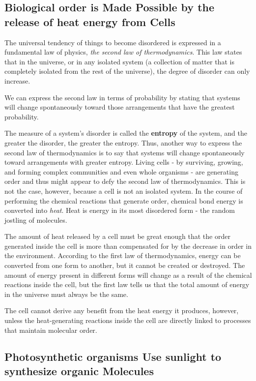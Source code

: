 \subsection{Biological order is Made Possible by the release of heat energy from Cells}

The universal tendency of things to become disordered is expressed in a
fundamental law of physics, \textit{the second law of thermodynamics}. This law
states that in the universe, or in any isolated system (a collection of matter
that is completely isolated from the rest of the universe), the degree
of disorder can only increase.

We can express the second law in terms of probability by stating that
systems will change spontaneously toward those arrangements that have
the greatest probability.

The measure of a system’s disorder is called the \textbf{entropy} of the system,
and the greater the disorder, the greater the entropy. Thus, another way
to express the second law of thermodynamics is to say that systems will
change spontaneously toward arrangements with greater entropy.
Living cells - by surviving, growing, and forming complex communities and
even whole organisms - are generating order and thus might appear to
defy the second law of thermodynamics. This is not the case, however,
because a cell is not an isolated system.
In the course of performing the chemical reactions that generate
order, chemical bond energy is converted into \textit{heat}. Heat is energy in its
most disordered form - the random jostling of molecules.

The amount of heat released by a cell must be great enough that the order
generated inside the cell is more than compensated for by the decrease
in order in the environment.
According to the first law of thermodynamics, energy can be converted from one form to
another, but it cannot be created or destroyed.
The amount of energy
present in different forms will change as a result of the chemical reactions
inside the cell, but the first law tells us that the total amount of
energy in the universe must always be the same.

The cell cannot derive any benefit from the heat energy it produces,
however, unless the heat-generating reactions inside the cell are directly
linked to processes that maintain molecular order.

\subsection{Photosynthetic organisms Use sunlight to synthesize organic Molecules}

